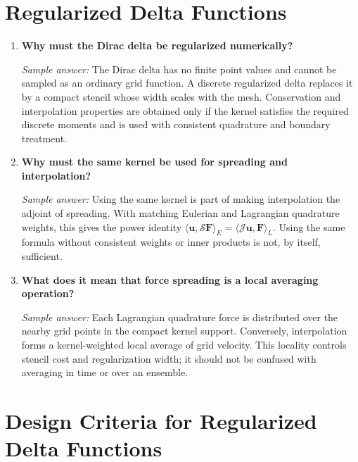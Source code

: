 \documentclass[11pt]{article}
\begin{document}
\section*{Regularized Delta Functions}

\begin{enumerate}[label=\arabic*., resume]

\item \textbf{Why must the Dirac delta be regularized numerically?}

\textit{Sample answer:}  
The Dirac delta has no finite point values and cannot be sampled as an ordinary
grid function. A discrete regularized delta replaces it by a compact stencil
whose width scales with the mesh. Conservation and interpolation properties are
obtained only if the kernel satisfies the required discrete moments and is used
with consistent quadrature and boundary treatment.

\item \textbf{Why must the same kernel be used for spreading and interpolation?}

\textit{Sample answer:}  
Using the same kernel is part of making interpolation the adjoint of spreading.
With matching Eulerian and Lagrangian quadrature weights, this gives the power
identity
$\langle\mathbf{u},\mathcal{S}\mathbf{F}\rangle_E
=\langle\mathcal{J}\mathbf{u},\mathbf{F}\rangle_L$.
Using the same formula without consistent weights or inner products is not, by
itself, sufficient.

\item \textbf{What does it mean that force spreading is a local averaging operation?}

\textit{Sample answer:}  
Each Lagrangian quadrature force is distributed over the nearby grid points in
the compact kernel support. Conversely, interpolation forms a kernel-weighted
local average of grid velocity. This locality controls stencil cost and
regularization width; it should not be confused with averaging in time or over
an ensemble.

\end{enumerate}

\section*{Design Criteria for Regularized Delta Functions}
\end{document}
